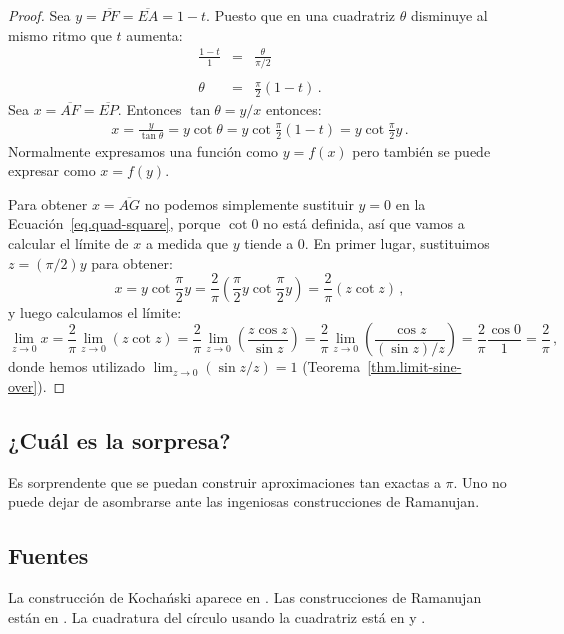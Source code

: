 \begin{proof}
Sea $y=\overline{PF}=\overline{EA}=1-t$. Puesto que en una cuadratriz $\theta$ disminuye al mismo ritmo que $t$ aumenta:
\begin{eqnarray*}
\frac{1-t}{1} &=& \frac{\theta}{\pi/2}\\
&&\\
\theta &=&\frac{\pi}{2}(1-t)\,.
\end{eqnarray*}
Sea $x=\overline{AF}=\overline{EP}$. Entonces $\tan \theta = y/x$ entonces:
\begin{align}\label{eq.quad-square}
x = \frac{y}{\tan\theta}=y\cot\theta=y\cot \frac{\pi}{2}(1-t)=y\cot \frac{\pi}{2}y\,.
\end{align}
Normalmente expresamos una función como $y=f(x)$ pero también se puede expresar como $x=f(y)$. 

Para obtener $x=\overline{AG}$ no podemos simplemente sustituir $y=0$ en la Ecuación~\ref{eq.quad-square}, porque $\cot 0$ no está definida, así que vamos a calcular el límite de $x$ a medida que $y$ tiende a $0$. En primer lugar, sustituimos $z=(\pi/2)y$ para obtener:
\[
x = y\cot \frac{\pi}{2}y = \frac{2}{\pi} \left(\frac{\pi}{2}y\cot \frac{\pi}{2}y\right)=\frac{2}{\pi}(z\cot z)\,,
\]
y luego calculamos el límite:
\[
\lim_{z\rightarrow 0} x=\frac{2}{\pi}\lim_{z\rightarrow 0} (z\cot z) = \frac{2}{\pi}\lim_{z\rightarrow 0} \left(\frac{z\cos z}{\sin z}\right) = \frac{2}{\pi}\lim_{z\rightarrow 0} \left(\frac{\cos z}{(\sin z)/z}\right) = \frac{2}{\pi}\frac{\cos 0}{1} = \frac{2}{\pi}\,,
\]
donde hemos utilizado $\lim_{z\rightarrow 0} (\sin z/z)=1$ (Teorema~\ref{thm.limit-sine-over}).
\end{proof}

\subsection*{¿Cuál es la sorpresa?}

Es sorprendente que se puedan construir aproximaciones tan exactas a $\pi$. Uno no puede dejar de asombrarse ante las ingeniosas construcciones de Ramanujan.

\subsection*{Fuentes}

La construcción de Kocha\'{n}ski aparece en \cite{bold}. Las construcciones de Ramanujan están en \cite{ramanujan1,ramanujan2}. La cuadratura del círculo usando la cuadratriz está en \cite[pp.~48--49]{martin} y \cite{wiki:quad}.
